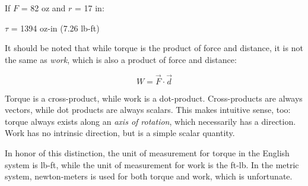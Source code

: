 
\noindent
If $F$ = 82 oz and $r$ = 17 in:

$\tau$ = 1394 oz-in (7.26 lb-ft) 

\vskip 10pt

It should be noted that while torque is the product of force and distance, it is not the same as {\it work}, which is also a product of force and distance:

$$W = \vec F \cdot \vec d$$

Torque is a cross-product, while work is a dot-product.  Cross-products are always vectors, while dot products are always scalars.  This makes intuitive sense, too: torque always exists along an {\it axis of rotation}, which necessarily has a direction.  Work has no intrinsic direction, but is a simple scalar quantity.

In honor of this distinction, the unit of measurement for torque in the English system is lb-ft, while the unit of measurement for work is the ft-lb.  In the metric system, newton-meters is used for both torque and work, which is unfortunate.





